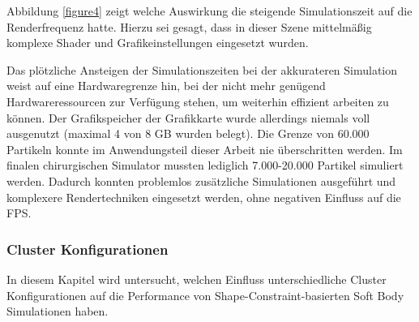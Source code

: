 Abbildung \ref{figure4} zeigt welche Auswirkung die steigende Simulationszeit auf die Renderfrequenz hatte. Hierzu sei gesagt, dass in dieser Szene mittelmäßig komplexe Shader und Grafikeinstellungen eingesetzt wurden.


Das plötzliche Ansteigen der Simulationszeiten bei der akkurateren Simulation weist auf eine Hardwaregrenze hin, bei der nicht mehr genügend Hardwareressourcen zur Verfügung stehen, um weiterhin effizient arbeiten zu können. Der Grafikspeicher der Grafikkarte wurde allerdings niemals voll ausgenutzt (maximal 4 von 8 GB wurden belegt). 
Die Grenze von 60.000 Partikeln konnte im Anwendungsteil dieser Arbeit nie überschritten werden. Im finalen chirurgischen Simulator mussten lediglich 7.000-20.000 Partikel simuliert werden. Dadurch konnten problemlos zusätzliche Simulationen ausgeführt und komplexere Rendertechniken eingesetzt werden, ohne negativen Einfluss auf die FPS.






\subsubsection{Cluster Konfigurationen}




In diesem Kapitel wird untersucht, welchen Einfluss unterschiedliche Cluster Konfigurationen auf die Performance von Shape-Constraint-basierten Soft Body Simulationen haben. 

